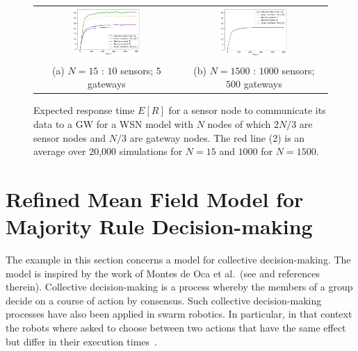 \documentclass{elsarticle}
\begin{document}
\begin{figure}[ht]
\begin{center}
  \begin{tabular}{@{}c@{}c@{}}
    \includegraphics[width=0.5\textwidth]{WSNmodel_simu_N15}%
    &\includegraphics[width=0.5\textwidth]{WSNmodel_simu_N1500}\\%
    (a) $N=15$ : $10$ sensors; $5$ gateways
    &(b) $N=1500$ : $1000$ sensors; $500$ gateways
  \end{tabular}
\end{center}

\caption{\label{fig:wsn_res} Expected response time $E[R]$ for a
  sensor node to communicate its data to a GW for a WSN model with $N$
  nodes of which $2N/3$ are sensor nodes and $N/3$ are gateway
  nodes. The red line (2) is an average over 20,000 simulations for
  $N=15$ and $1000$ for $N=1500$.}
\end{figure}


\section{Refined Mean Field Model for Majority Rule Decision-making}
\label{sect:RefVoting}


The example in this section concerns a model for collective decision-making. The model is inspired by the work of Montes de Oca et al.~(see \cite{Mo+11,Sch11} and references therein). Collective decision-making is a process whereby the members of a group decide on a course of action by consensus. Such collective decision-making processes have also been applied in swarm robotics. In particular, in that context the robots where asked to choose between two actions that have the same effect but differ in their execution times~\cite{Mo+11}. 
\end{document}
